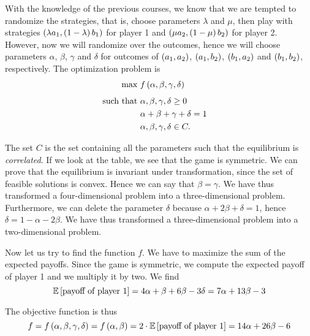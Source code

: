 With the knowledge of the previous courses, we know that we are tempted to randomize the strategies, that is, choose parameters $\lambda$ and $\mu$, then play with strategies $\parent{\lambda a_1, \parent{1 - \lambda} b_1}$ for player 1 and $\parent{\mu a_2, \parent{1 - \mu} b_2}$ for player 2.
However, now we will randomize over the outcomes, hence we will choose parameters $\alpha$, $\beta$, $\gamma$ and $\delta$ for outcomes of $\parent{a_1, a_2}$, $\parent{a_1, b_2}$, $\parent{b_1, a_2}$ and $\parent{b_1, b_2}$, respectively.
The optimization problem is
\begin{equation*}
    \begin{aligned}
    \underset{}{\text{max }} &
    f \parent{\alpha, \beta, \gamma, \delta} & & \\
    \text{such that  } &
        \alpha, \beta, \gamma, \delta \geq 0 & \\
        & \alpha + \beta + \gamma + \delta = 1 & \\
        & \alpha, \beta, \gamma, \delta \in C . &
    \end{aligned}
    \end{equation*}

The set $C$ is the set containing all the parameters such that the equilibrium is \textit{correlated}. If we look at the table, we see that the game is symmetric.
We can prove that the equilibrium is invariant under transformation, since the set of feasible solutions is convex. Hence we can say that $\beta = \gamma$. We have thus transformed a four-dimensional problem into a three-dimensional problem.
Furthermore, we can delete the parameter $\delta$ because $\alpha + 2 \beta + \delta = 1$, hence $\delta = 1 - \alpha - 2 \beta$. We have thus transformed a three-dimensional problem into a two-dimensional problem.

Now let us try to find the function $f$. We have to maximize the sum of the expected payoffs. Since the game is symmetric, we compute the expected payoff of player 1 and we multiply it by two. We find
\begin{equation*}
    \mathbb{E} \squared{\text{payoff of player 1}}
    = 4 \alpha + \beta + 6 \beta - 3 \delta
    = 7 \alpha + 13 \beta - 3
\end{equation*}

The objective function is thus
\begin{equation*}
    f
    = f \parent{\alpha, \beta, \gamma, \delta}
    = f \parent{\alpha, \beta}
    = 2 \cdot \mathbb{E} \squared{\text{payoff of player 1}}
    = 14 \alpha + 26 \beta - 6
\end{equation*}



